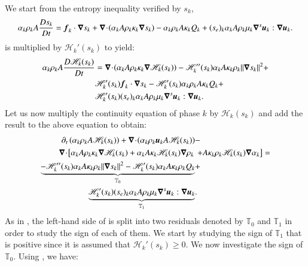 \documentclass[preprint,10pt]{elsarticle}
\begin{document}
\begin{appendices}
We start from the entropy inequality verified by $s_k$, 
%
\begin{equation}\label{eq:ent-res-7-eqn-diss-terms-app}
\alpha_k \rho_k A \frac{Ds_k}{Dt} =  \boldsymbol f_k \cdot \boldsymbol\nabla s_k + \boldsymbol\nabla\! \cdot \! \left( \alpha_k A \rho_k \kappa_k  \boldsymbol\nabla s_k \right)  
- \alpha_k \rho_k A \kappa_k Q_k + (s_e)_k \alpha_k A \rho_k \mu_k \boldsymbol\nabla^s \boldsymbol u_k : \boldsymbol\nabla \boldsymbol u_k.
\end{equation}
%
 is multiplied by $\mathscr{H}_k'(s_k)$ to yield:
%
\begin{align}\label{eq:ent-res-7-eqn-diss-terms-app2}
\alpha_k \rho_k A \frac{D\mathscr{H}_k(s_k)}{Dt} &= \boldsymbol\nabla\! \cdot \! \left( \alpha_k A \rho_k \kappa_k \boldsymbol\nabla \mathscr{H}_k (s_k) \right) - \mathscr{H}_k''(s_k) \alpha_k A \kappa_k \rho_k \| \boldsymbol\nabla s_k \|^2 + \nonumber\\
&\mathscr{H}_k'(s_k) \boldsymbol f_k \cdot \boldsymbol\nabla s_k - \mathscr{H}_k'(s_k)\alpha_k \rho_k A \kappa_k Q_k + \nonumber \\
& \mathscr{H}_k'(s_k)(s_e)_k \alpha_k A \rho_k \mu_k \boldsymbol\nabla^s \boldsymbol u_k : \boldsymbol\nabla \boldsymbol u_k.
\end{align}
%
Let us now multiply the continuity equation of phase $k$ by $\mathscr{H}_k (s_k)$ and add the result to the above equation to obtain:
%
\begin{align}\label{eq:ent-res-7-eqn-diss-terms-app3}
\partial_t \left( \alpha_k \rho_k A \mathscr{H}_k(s_k)\right) + \boldsymbol\nabla\! \cdot \! \left( \alpha_k \rho_k \boldsymbol u_k A \mathscr{H}_k(s_k) \right)  &- \nonumber\\
\boldsymbol\nabla\! \cdot \! \left[ \alpha_k A \rho_k \kappa_k \boldsymbol\nabla \mathscr{H}_k (s_k) + \alpha_k A \kappa_k \mathscr{H}_k (s_k) \boldsymbol\nabla \rho_k  \right. & \left. + A \kappa_k \rho_k \mathscr{H}_k (s_k) \boldsymbol\nabla \alpha_k\right] = \nonumber \\
\underbrace{-\mathscr{H}_k''(s_k) \alpha_k A \kappa_k \rho_k \| \boldsymbol\nabla s_k \|^2  - \mathscr{H}_k'(s_k) \alpha_k A \kappa_k \rho_k  Q_k}_{\mathbb{T}_0} &+\nonumber \\
\underbrace{ \mathscr{H}_k'(s_k)(s_e)_k  \alpha_k A \rho_k \mu_k \boldsymbol\nabla^s \boldsymbol u_k : \boldsymbol\nabla \boldsymbol u_k}_{\mathbb{T}_1} & .
\end{align}
%
As in , the left-hand side of  is split into two residuals denoted by $\mathbb{T}_0$ and $\mathbb{T}_1$ in order to study the sign of each of them. We start by studying the sign of $\mathbb{T}_1$ that is positive since it is assumed that $ \mathscr{H}_k'(s_k) \geq 0$. We now investigate the sign of $\mathbb{T}_0$. Using , we have:

\end{appendices}
\end{document}
